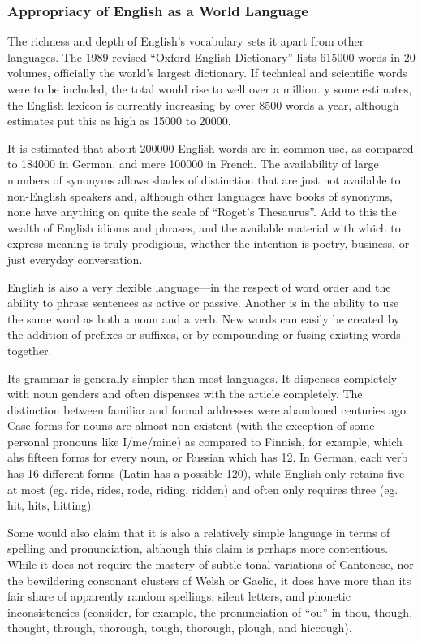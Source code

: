 \documentclass[../main.tex]{subfiles}
\begin{document}
        \subsubsection{Appropriacy of English as a World Language}
        The richness and depth of English's vocabulary sets it apart from other languages. The 1989 revised ``Oxford English Dictionary'' lists \num{615000} words in 20 volumes, officially the world's largest dictionary. If technical and scientific words were to be included, the total would rise to well over a million. y some estimates, the English lexicon is currently increasing by over 8500 words a year, although estimates put this as high as \num{15000} to \num{20000}. \par
        It is estimated that about \num{200000} English words are in common use, as compared to \num{184000} in German, and mere \num{100000} in French. The availability of large numbers of synonyms allows shades of distinction that are just not available to non-English speakers and, although other languages have books of synonyms, none have anything on quite the scale of ``Roget's  Thesaurus''. Add to this the wealth of English idioms and phrases, and the available material with which to express meaning is truly prodigious, whether the intention is poetry, business, or just everyday conversation. \par 
        English is also a very flexible language---in the respect of word order and the ability to phrase sentences as active or passive. Another is in the ability to use the same word as both a noun and a verb. New words can easily be created by the addition of prefixes or suffixes, or by compounding or fusing existing words together. \par
        Its grammar is generally simpler than most languages. It dispenses completely with noun genders and often dispenses with the article completely. The distinction between familiar and formal addresses were abandoned centuries ago. Case forms for nouns are almost non-existent (with the exception of some personal pronouns like I/me/mine) as compared to Finnish, for example, which ahs fifteen forms for every noun, or Russian which has 12. In German, each verb has 16 different forms (Latin has a possible 120), while English only retains five at most (eg. ride, rides, rode, riding, ridden) and often only requires three  (eg. hit, hits, hitting). \par
        Some would also claim that it is also a relatively simple language in terms of spelling and pronunciation, although this claim is perhaps more contentious. While it does not require the mastery of subtle tonal variations of Cantonese, nor the bewildering consonant clusters of Welsh or Gaelic, it does have more than its fair share of apparently random spellings, silent letters, and phonetic inconsistencies (consider, for example, the pronunciation of ``ou'' in thou, though, thought, through, thorough, tough, thorough, plough, and hiccough). \par
\end{document}
